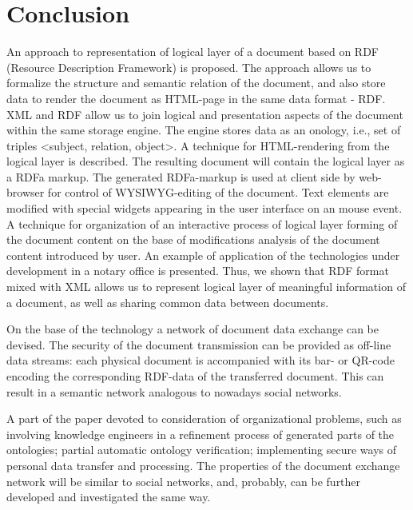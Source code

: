 \documentclass[conference]{IEEEtran}
\begin{document}
\section{Conclusion}

An approach to representation of logical layer of a document based on
RDF (Resource Description Framework) is proposed. The approach allows
us to formalize the structure and semantic relation of the document,
and also store data to render the document as HTML-page in the same
data format - RDF. XML and RDF allow us to join logical and
presentation aspects of the document within the same storage
engine. The engine stores data as an onology, i.e., set of triples
<subject, relation, object>. A technique for HTML-rendering from the
logical layer is described. The resulting document will contain the
logical layer as a RDFa markup. The generated RDFa-markup is used at
client side by web-browser for control of WYSIWYG-editing of the
document. Text elements are modified with special widgets appearing in
the user interface on an mouse event. A technique for organization of
an interactive process of logical layer forming of the document
content on the base of modifications analysis of the document content
introduced by user. An example of application of the technologies
under development in a notary office is presented. Thus, we shown that
RDF format mixed with XML allows us to represent logical layer of
meaningful information of a document, as well as sharing common data
between documents.

On the base of the technology a network of document data exchange can be devised. The security of the document transmission can be provided as off-line data streams: each physical document is accompanied with its bar- or QR-code encoding the corresponding RDF-data of the transferred document. This can result in a semantic network analogous to nowadays social networks.

A part of the paper devoted to consideration of organizational problems, such as involving knowledge engineers in a refinement process of generated parts of the ontologies; partial automatic ontology verification; implementing secure ways of personal data transfer and processing. The properties of the document exchange network will be similar to social networks, and, probably, can be further developed and investigated the same way.





\end{document}
